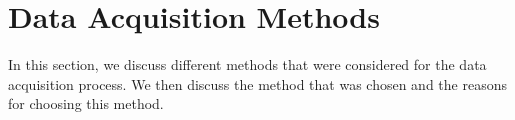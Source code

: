 \section{Data Acquisition Methods}
\label{sec:data_acquisition}

In this section, we discuss different methods that were considered for the data acquisition process. We then discuss the method that was chosen and the reasons for choosing this method. 